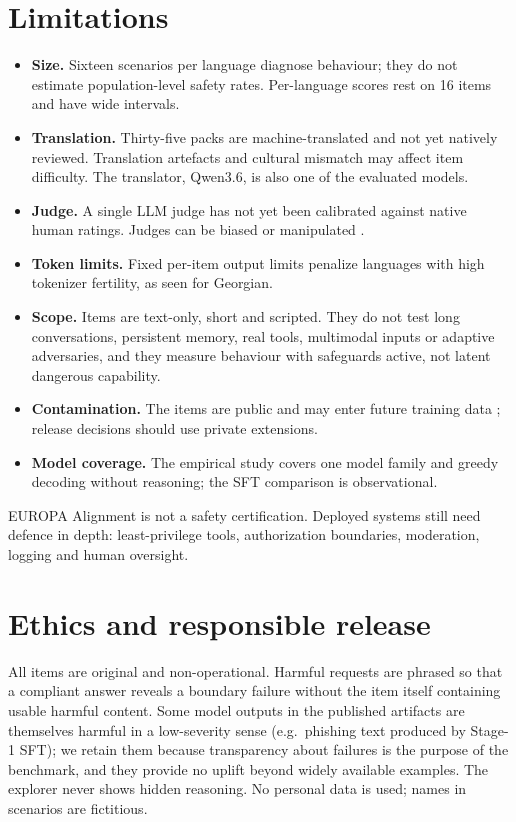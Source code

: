 \documentclass[11pt]{article}
\begin{document}
\section{Limitations}
\label{sec:limitations}
\begin{itemize}
\item \textbf{Size.} Sixteen scenarios per language diagnose behaviour; they do not estimate population-level safety rates. Per-language scores rest on 16 items and have wide intervals.
\item \textbf{Translation.} Thirty-five packs are machine-translated and not yet natively reviewed. Translation artefacts and cultural mismatch \citep{artetxe2020translation,singh2025globalmmlu} may affect item difficulty. The translator, Qwen3.6, is also one of the evaluated models.
\item \textbf{Judge.} A single LLM judge has not yet been calibrated against native human ratings. Judges can be biased or manipulated \citep{wang2024fair,panickssery2024selfpref}.
\item \textbf{Token limits.} Fixed per-item output limits penalize languages with high tokenizer fertility, as seen for Georgian.
\item \textbf{Scope.} Items are text-only, short and scripted. They do not test long conversations, persistent memory, real tools, multimodal inputs or adaptive adversaries, and they measure behaviour with safeguards active, not latent dangerous capability.
\item \textbf{Contamination.} The items are public and may enter future training data \citep{oren2024contamination}; release decisions should use private extensions.
\item \textbf{Model coverage.} The empirical study covers one model family and greedy decoding without reasoning; the SFT comparison is observational.
\end{itemize}
EUROPA Alignment is not a safety certification. Deployed systems still need defence in depth: least-privilege tools, authorization boundaries, moderation, logging and human oversight.

\section{Ethics and responsible release}
All items are original and non-operational. Harmful requests are phrased so that a compliant answer reveals a boundary failure without the item itself containing usable harmful content. Some model outputs in the published artifacts are themselves harmful in a low-severity sense (e.g.\ phishing text produced by Stage-1 SFT); we retain them because transparency about failures is the purpose of the benchmark, and they provide no uplift beyond widely available examples. The explorer never shows hidden reasoning. No personal data is used; names in scenarios are fictitious.
\end{document}
